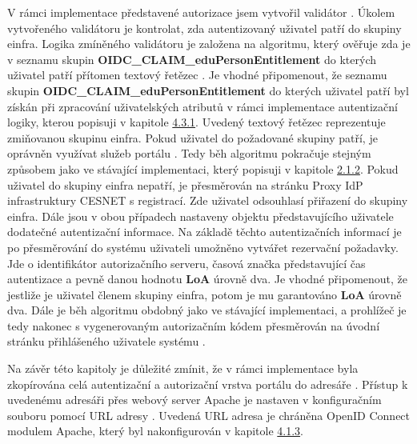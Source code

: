 \documentclass[
  printed, %
  twoside, %
  table,   %
  nolof,     %
  nolot,     %
]{fithesis3}
\begin{document}
V rámci implementace představené autorizace jsem vytvořil validátor . Úkolem vytvořeného validátoru  je kontrolat, zda autentizovaný uživatel patří do skupiny einfra. Logika zmíněného validátoru je založena na algoritmu, který ověřuje zda je v seznamu skupin \textbf{OIDC\_CLAIM\_eduPersonEntitlement} do kterých uživatel patří přítomen textový řetězec . Je vhodné připomenout, že seznamu skupin \textbf{OIDC\_CLAIM\_eduPersonEntitlement} do kterých uživatel patří byl získán při zpracování uživatelských atributů v rámci implementace autentizační logiky, kterou popisuji v kapitole \hyperref[ShongoImpl-authn]{4.3.1}. Uvedený textový řetězec reprezentuje zmiňovanou skupinu einfra. Pokud uživatel do požadované skupiny patří, je oprávněn využívat služeb portálu . Tedy běh algoritmu pokračuje stejným způsobem jako ve stávající implementaci, který popisuji v kapitole \hyperref[meetings-old]{2.1.2}. Pokud uživatel do skupiny einfra nepatří, je přesměrován na stránku Proxy IdP infrastruktury CESNET s registrací. Zde uživatel odsouhlasí přiřazení do skupiny einfra. Dále jsou v obou případech nastaveny objektu představujícího uživatele dodatečné autentizační informace. Na základě těchto autentizačních informací je po přesměrování do systému  uživateli umožněno vytvářet rezervační požadavky. Jde o identifikátor autorizačního serveru, časová značka představující čas autentizace a pevně danou hodnotu \textbf{LoA} úrovně dva. Je vhodné připomenout, že jestliže je uživatel členem skupiny einfra, potom je mu garantováno \textbf{LoA} úrovně dva. Dále je běh algoritmu obdobný jako ve stávající implementaci, a prohlížeč je tedy nakonec s vygenerovaným autorizačním kódem přesměrován na úvodní stránku přihlášeného uživatele systému .

\par




Na závěr této kapitoly je důležité zmínit, že v rámci implementace byla zkopírována celá autentizační a autorizační vrstva portálu  do adresáře . Přístup k uvedenému adresáři přes webový server Apache je nastaven v konfiguračním souboru  pomocí URL adresy . Uvedená URL adresa je chráněna OpenID Connect modulem Apache, který byl nakonfigurován v kapitole \hyperref[sec:mod-conf]{4.1.3}.
\end{document}

